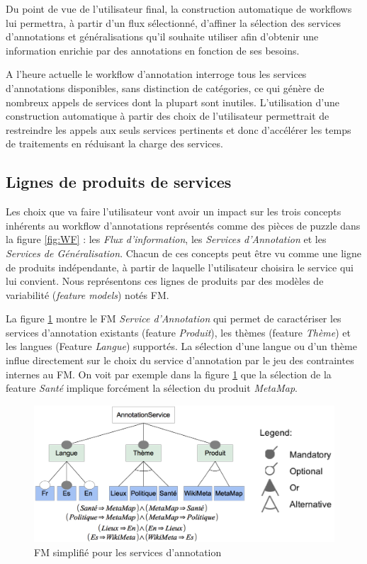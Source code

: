 \documentclass[]{ciel}
\begin{document}
Du point de vue de l'utilisateur final, la construction automatique de workflows lui permettra, à partir d'un flux sélectionné, d'affiner la sélection des services d'annotations et généralisations qu'il souhaite utiliser afin d'obtenir une information enrichie par des annotations en fonction de ses besoins. 

A l'heure actuelle le workflow d'annotation interroge tous les services d'annotations disponibles, sans distinction de catégories, ce qui génère de nombreux appels de services dont la plupart sont inutiles. L'utilisation d'une construction automatique à partir des choix de l'utilisateur permettrait de restreindre les appels aux seuls services pertinents et donc d'accélérer les temps de traitements en réduisant la charge des services. 


\subsection{Lignes de produits de services}
Les choix que va faire l'utilisateur vont avoir un impact sur les trois concepts inhérents au workflow d'annotations représentés comme des pièces de puzzle dans la figure \ref{fig:WF} : les \textit{Flux d'information}, les \textit{Services d'Annotation} et les \textit{Services de Généralisation}. Chacun de ces concepts peut être vu comme une ligne de produits indépendante, à partir de laquelle l'utilisateur choisira le service qui lui convient. Nous représentons ces lignes de produits par des modèles de variabilité (\textsl{feature models}) notés FM.

La figure \ref{fig:mmFM} montre le FM \textit{Service d'Annotation} qui permet de caractériser les services d'annotation existants (feature \textit{Produit}), les thèmes (feature \textit{Thème}) et les langues (Feature \textit{Langue}) supportés. La sélection d'une langue ou d'un thème influe directement sur le choix du service d'annotation par le jeu des contraintes internes au FM. On voit par exemple dans la figure \ref{fig:mmFM} que la sélection de la feature \textit{Santé} implique forcément la sélection du produit \textit{MetaMap}.

\begin{figure}[htb!]
	\begin{centering}
	\includegraphics[scale=0.4]{FM.png}
	\caption{FM simplifié pour les services d'annotation}
	\label{fig:mmFM}
	\end{centering}
\end{figure}
\end{document}
